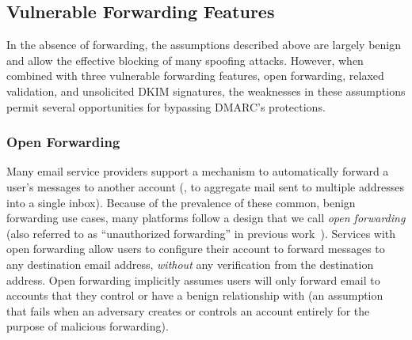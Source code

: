 \subsection{Vulnerable Forwarding Features}
\label{subsec:fwding_vuln}
In the absence of forwarding, the assumptions described above are
largely benign and allow the effective blocking of many spoofing
attacks.  However, when combined with three vulnerable forwarding
features, open forwarding, relaxed validation, and unsolicited DKIM signatures, the weaknesses in
these assumptions permit several opportunities for bypassing DMARC's
protections.



\subsubsection{Open Forwarding}
\label{subsubsec:open_forwarding}
Many email service providers support a mechanism to automatically
forward a user's messages to another account (\eg, to aggregate mail
sent to multiple addresses into a single inbox).  Because of the
prevalence of these common, benign forwarding use cases, many
platforms follow a design that we call \emph{open forwarding} (also
referred to as ``unauthorized forwarding'' in previous work~\cite{shen2020weak}).  Services with open forwarding allow users
to configure their account to forward messages to any destination
email address, \textit{without} any verification from the destination
address.  Open forwarding implicitly assumes users will only forward
email to accounts that they control or have a benign relationship with
(an assumption that fails when an adversary creates or controls an account
entirely for the purpose of malicious forwarding).

